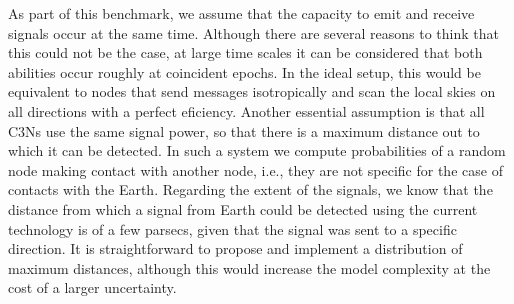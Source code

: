 \documentclass[crop]{CSLB}
\newcommand{\cetis}{C3Ns}
\begin{document}
As part of this benchmark, we assume that the capacity to emit and receive
signals occur at the same time.
%
Although there are several reasons to think that this could not be the case, at
large time scales it can be considered that both abilities occur roughly at
coincident epochs.
%
In the ideal setup, this would be equivalent to nodes that send messages
isotropically and scan the local skies on all directions with a perfect
eficiency.
%
Another essential assumption is that all \cetis{} use the same signal power, so
that there is a maximum distance out to which it can be detected.
%
%
In such a system we compute probabilities of a random node making contact with
another node, i.e., they are not specific for the case of contacts with the
Earth.
%
Regarding the extent of the signals, we know that the distance from which a
signal from Earth could be detected using the current technology is of a few
parsecs, given that the signal was sent to a specific direction.
%
It is straightforward to propose and implement a distribution of maximum
distances, although this would increase the model complexity at the cost of a
larger uncertainty.



%
%
\end{document}
